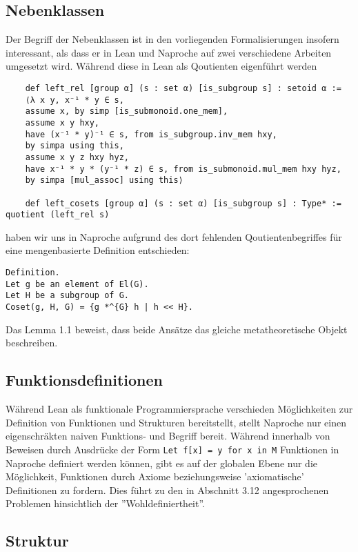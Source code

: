 \documentclass[a4paper,12pt]{scrartcl}
\begin{document}
\subsection{Nebenklassen}

Der Begriff der Nebenklassen ist in den vorliegenden Formalisierungen insofern interessant, als dass er in Lean und Naproche auf zwei verschiedene Arbeiten umgesetzt wird. 
Während diese in Lean als Qoutienten eigenführt werden 
\lstset{language = lean}
\begin{lstlisting}
	def left_rel [group α] (s : set α) [is_subgroup s] : setoid α :=
	⟨λ x y, x⁻¹ * y ∈ s,
	assume x, by simp [is_submonoid.one_mem],
	assume x y hxy,
	have (x⁻¹ * y)⁻¹ ∈ s, from is_subgroup.inv_mem hxy,
	by simpa using this,
	assume x y z hxy hyz,
	have x⁻¹ * y * (y⁻¹ * z) ∈ s, from is_submonoid.mul_mem hxy hyz,
	by simpa [mul_assoc] using this⟩
	
	def left_cosets [group α] (s : set α) [is_subgroup s] : Type* := quotient (left_rel s)
    \end{lstlisting} haben wir uns in Naproche aufgrund des dort fehlenden Qoutientenbegriffes für eine mengenbasierte Definition entschieden:

\lstset{language = ftl}
    \begin{lstlisting}
Definition.
Let g be an element of El(G).
Let H be a subgroup of G.
Coset(g, H, G) = {g *^{G} h | h << H}.
    \end{lstlisting}

Das Lemma 1.1 beweist, dass beide Ansätze das gleiche metatheoretische Objekt beschreiben.
\subsection{Funktionsdefinitionen}

Während Lean als funktionale Programmiersprache verschieden Möglichkeiten zur Definition von Funktionen und Strukturen bereitstellt, stellt Naproche nur einen eigenschräkten naiven Funktions- und Begriff bereit. Während innerhalb von Beweisen durch Ausdrücke der Form \lstset{language = ftl} \lstinline{Let f[x] = y for x in M} Funktionen in Naproche definiert werden können, gibt es auf der globalen Ebene nur die Möglichkeit, Funktionen durch Axiome beziehungsweise 'axiomatische' Definitionen zu fordern. Dies führt zu den in Abschnitt 3.12 angesprochenen Problemen hinsichtlich der ''Wohldefiniertheit''.

\subsection{Struktur}
\end{document}
